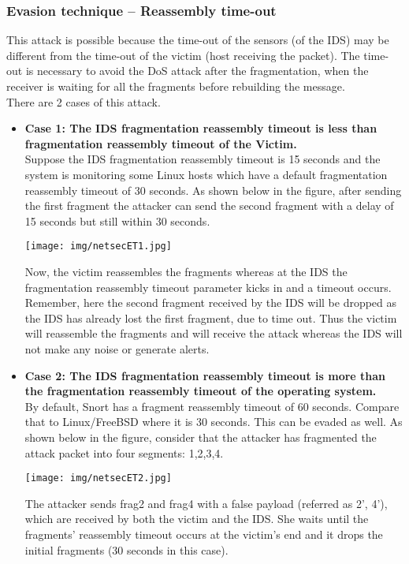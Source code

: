 \documentclass[a4paper, 10pt, titlepage]{article}
\begin{document}
\subsubsection*{Evasion technique – Reassembly time-out}
This attack is possible because the time-out of the sensors (of the IDS) may be different from the time-out of the victim (host receiving the packet). The time-out is necessary to avoid the DoS attack after the fragmentation, when the receiver is waiting for all the fragments before rebuilding the message. \medskip\\ There are 2 cases of this attack. 
\begin{itemize}
	\item \textbf{Case 1: The IDS fragmentation reassembly timeout is less than fragmentation reassembly timeout of the Victim.}\\
	Suppose the IDS fragmentation reassembly timeout is 15 seconds and the system is monitoring some Linux hosts which have a default fragmentation reassembly timeout of 30 seconds. As shown below in the figure, after sending the first fragment the attacker can send the second fragment with a delay of 15 seconds but still within 30 seconds.
	\begin{center}
		\texttt{[image: img/netsecET1.jpg]}
	\end{center}
	Now, the victim reassembles the fragments whereas at the IDS the fragmentation reassembly timeout parameter kicks in and a timeout occurs. Remember, here the second fragment received by the IDS will be dropped as the IDS has already lost the first fragment, due to time out. Thus the victim will reassemble the fragments and will receive the attack whereas the IDS will not make any noise or generate alerts.
	\item \textbf{Case 2: The IDS fragmentation reassembly timeout is more than the fragmentation reassembly timeout of the operating system.}\\
	By default, Snort has a fragment reassembly timeout of 60 seconds. Compare that to Linux/FreeBSD where it is 30 seconds. This can be evaded as well. As shown below in the figure, consider that the attacker has fragmented the attack packet into four segments: 1,2,3,4.
	\begin{center}
		\texttt{[image: img/netsecET2.jpg]}
	\end{center}
	The attacker sends frag2 and frag4 with a false payload (referred as 2', 4'), which are received by both the victim and the IDS. She waits until the fragments' reassembly timeout occurs at the victim's end and it drops the initial fragments (30 seconds in this case).
	

\end{itemize}
\end{document}
